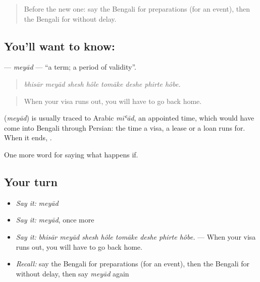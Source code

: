 \label{lesson:BN-C378-meyad}



\begin{quote}
Before the new one: say the Bengali for preparations (for an event), then the Bengali for without delay.
\end{quote}

\subsection*{You'll want to know: }
\textbf{} — \emph{meyād} — \textquotedblleft{}a term; a period of validity\textquotedblright{}.

\begin{quote}
       
\end{quote}

\begin{quote}
\emph{bhisār meyād shesh hôle tomāke deshe phirte hôbe.}
\end{quote}

\begin{quote}
When your visa runs out, you will have to go back home.
\end{quote}

\begin{cousinweb}
\textbf{} (\emph{meyād}) is usually traced to Arabic \emph{mīʿād}, an appointed time, which would have come into Bengali through Persian: the time a visa, a lease or a loan runs for. When it ends,   .
\end{cousinweb}

\begin{grammarlens}[title={What you've built}]
One more word for saying what happens if.
\end{grammarlens}

\subsection*{Your turn}
\begin{itemize}
\raggedright
  \item \emph{Say it:} \emph{meyād}
  \item \emph{Say it:} \emph{meyād}, once more
  \item \emph{Say it:} \emph{bhisār meyād shesh hôle tomāke deshe phirte hôbe.} — When your visa runs out, you will have to go back home.
  \item \emph{Recall:} say the Bengali for preparations (for an event), then the Bengali for without delay, then say \emph{meyād} again
\end{itemize}


